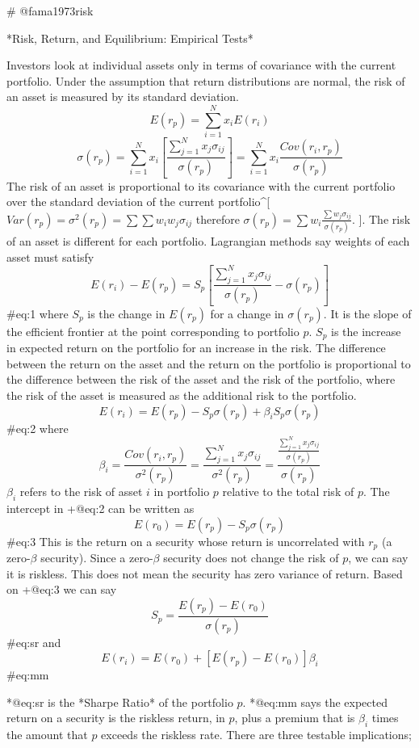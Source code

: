 
# @fama1973risk

*Risk, Return, and Equilibrium: Empirical Tests* 

Investors look at individual assets only in terms of covariance with the current portfolio.
Under the assumption that return distributions are normal, the risk of an asset is measured by its standard deviation.
$$
E(r_p) = \sum_{i=1}^N x_iE(r_i)
$$
$$
\sigma(r_p) = \sum_{i=1}^N x_i
\left[ \frac{\sum_{j=1}^N x_j \sigma_{ij}}{\sigma(r_p)} \right] =
\sum_{i=1}^N x_i \frac{Cov(r_i, r_p)}{\sigma(r_p)}
$$
The risk of an asset is proportional to its covariance with the current portfolio over the standard deviation of the current portfolio^[$Var(r_p)=\sigma^2(r_p)=\sum\sum w_iw_j\sigma_{ij}$ therefore $\sigma(r_p)=\sum w_i\frac{\sum w_j\sigma_{ij}}{\sigma(r_p)}$.
].
The risk of an asset is different for each portfolio.
Lagrangian methods say weights of each asset must satisfy
$$
E(r_i) - E(r_p) = S_p
\left[
\frac{\sum_{j=1}^Nx_j\sigma_{ij}}{\sigma(r_p)}-\sigma(r_p)
\right]
$$ {#eq:1}
where $S_p$ is the change in $E(r_p)$ for a change in $\sigma(r_p)$.
It is the slope of the efficient frontier at the point corresponding to portfolio $p$.
$S_p$ is the increase in expected return on the portfolio for an increase in the risk.
The difference between the return on the asset and the return on the portfolio is proportional to the difference between the risk of the asset and the risk of the portfolio, where the risk of the asset is measured as the additional risk to the portfolio.
$$
E(r_i) = E(r_p) - S_p\sigma(r_p) + \beta_iS_p\sigma(r_p)
$$ {#eq:2}
where
$$
\beta_i = \frac{Cov(r_i, r_p)}{\sigma^2(r_p)} =
    \frac{\sum_{j=1}^Nx_j\sigma_{ij}}{\sigma^2(r_p)} =
    \frac{\frac{\sum_{j=1}^Nx_j\sigma_{ij}}{\sigma(r_p)}}{\sigma(r_p)}
$$
$\beta_i$ refers to the risk of asset $i$ in portfolio $p$ relative to the total risk of $p$.
The intercept in +@eq:2 can be written as
$$
E(r_0) = E(r_p) - S_p\sigma(r_p)
$$ {#eq:3}
This is the return on a security whose return is uncorrelated with $r_p$ (a zero-$\beta$ security).
Since a zero-$\beta$ security does not change the risk of $p$, we can say it is riskless.
This does not mean the security has zero variance of return.
Based on +@eq:3 we can say
$$
S_p = \frac{E(r_p) - E(r_0)}{\sigma(r_p)}
$$ {#eq:sr}
and
$$
E(r_i) = E(r_0) + \left[E(r_p) - E(r_0)\right]\beta_i
$$ {#eq:mm}

*@eq:sr is the *Sharpe Ratio* of the portfolio $p$.
*@eq:mm says the expected return on a security is the riskless return, in $p$, plus a premium that is $\beta_i$ times the amount that $p$ exceeds the riskless rate.
There are three testable implications;

